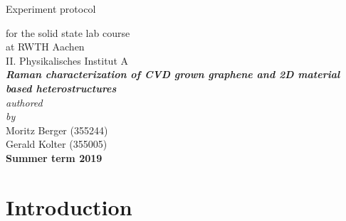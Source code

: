 \documentclass[12pt,a4paper]{article}
\author{Gerald}
\begin{document}
	\setlength{\parindent}{0pt} 
	\begin{center}
		{\LARGE Experiment protocol}\\
		\begin{large}
			for the solid state lab course\\[0.4cm]
			at RWTH Aachen\\
			II. Physikalisches Institut A\\[5.5cm]
			\Large\textbf{\textsl{Raman characterization of CVD grown graphene and 2D material based heterostructures}}\\[5.5cm]
			\normalsize\textit{authored\\by}\\[0.4cm]
			\large{Moritz Berger (355244)\\Gerald Kolter (355005)}\\[2cm]
			\large \textbf{Summer term 2019}
		\end{large}
	\end{center}
	\newpage
	
	\tableofcontents
	\newpage

\section{Introduction}









\end{document}

